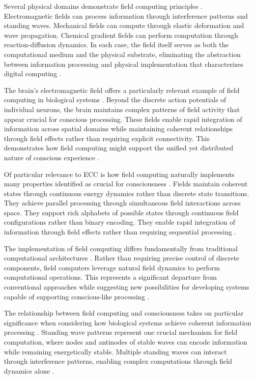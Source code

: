 \begin{refsection}
Several physical domains demonstrate field computing principles \cite{Haken2020}. Electromagnetic fields can process information through interference patterns and standing waves. Mechanical fields can compute through elastic deformation and wave propagation. Chemical gradient fields can perform computation through reaction-diffusion dynamics. In each case, the field itself serves as both the computational medium and the physical substrate, eliminating the abstraction between information processing and physical implementation that characterizes digital computing \cite{McFadden2018}.

The brain's electromagnetic field offers a particularly relevant example of field computing in biological systems \cite{Nikolic2019}. Beyond the discrete action potentials of individual neurons, the brain maintains complex patterns of field activity that appear crucial for conscious processing. These fields enable rapid integration of information across spatial domains while maintaining coherent relationships through field effects rather than requiring explicit connectivity. This demonstrates how field computing might support the unified yet distributed nature of conscious experience \cite{Pockett2021}.

Of particular relevance to ECC is how field computing naturally implements many properties identified as crucial for consciousness \cite{Pribram2017}. Fields maintain coherent states through continuous energy dynamics rather than discrete state transitions. They achieve parallel processing through simultaneous field interactions across space. They support rich alphabets of possible states through continuous field configurations rather than binary encoding. They enable rapid integration of information through field effects rather than requiring sequential processing \cite{Raychowdhury2020}.

The implementation of field computing differs fundamentally from traditional computational architectures \cite{Verschure2019}. Rather than requiring precise control of discrete components, field computers leverage natural field dynamics to perform computational operations. This represents a significant departure from conventional approaches while suggesting new possibilities for developing systems capable of supporting conscious-like processing \cite{Werbos2018}.

The relationship between field computing and consciousness takes on particular significance when considering how biological systems achieve coherent information processing \cite{Bandyopadhyay2020}. Standing wave patterns represent one crucial mechanism for field computation, where nodes and antinodes of stable waves can encode information while remaining energetically stable. Multiple standing waves can interact through interference patterns, enabling complex computations through field dynamics alone \cite{Calude2018b}.


\end{refsection}
